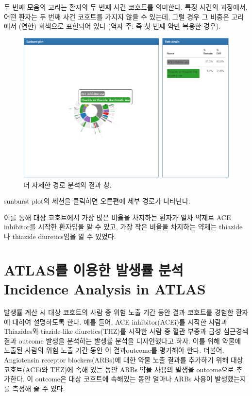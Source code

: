 \documentclass[10.5pt]{book}
\theoremstyle{definition}
\theoremstyle{definition}
\theoremstyle{definition}
\theoremstyle{remark}
\begin{document}
두 번째 모음의 고리는 환자의 두 번째 사건 코호트를 의미한다. 특정 사건의
과정에서, 어떤 환자는 두 번째 사건 코호트를 가지지 않을 수 있는데, 그럴
경우 그 비중은 고리에서 (연한) 회색으로 표현되어 있다 (역자 주: 즉 첫
번째 약만 복용한 경우).

\begin{figure}

{\centering \includegraphics[width=1\linewidth]{images/Characterization/atlasPathwaysResultsPathDetails} 

}

\caption{더 자세한 경로 분석의 결과 창.}\label{fig:atlasPathwaysResultsPathDetails}
\end{figure}

sunburst plot의 세션을 클릭하면 오른편에 세부 경로가 나타난다.

이를 통해 대상 코호트에서 가장 많은 비율을 차지하는 환자가 일차 약제로
ACE inhibitor를 시작한 환자임을 알 수 있고, 가장 작은 비율을 차지하는
약제는 thiazide나 thiazide diuretics임을 알 수 있었다.

\section{ATLAS를 이용한 발생률 분석 Incidence Analysis in
ATLAS}\label{atlas----incidence-analysis-in-atlas}

발생률 계산 시 대상 코호트의 사람 중 위험 노출 기간 동안 결과 코호트를
경험한 환자에 대하여 설명하도록 한다. 예를 들어, ACE inhibitor(ACEi)를
시작한 사람과 Thiazides와 tiazide-like diuretics(THZ)를 시작한 사람 중
혈관 부종과 급성 심근경색 결과 outcome 발생을 분석하는 발생률 분석을
디자인했다고 하자. 이를 위해 약물에 노출된 사람의 위험 노출 기간 동안 이
결과outcome를 평가해야 한다. 더불어, Angiotensin receptor
blockers(ARBs)에 대한 약물 노출 결과를 추가하기 위해 대상 코호트(ACEi와
THZ)에 속해 있는 동안 ARBs 약물 사용의 발생을 outcome으로 추가한다. 이
outcome은 대상 코호트에 속해있는 동안 얼마나 ARBs 사용이 발생했는지를
측정해 줄 수 있다.
\end{document}
